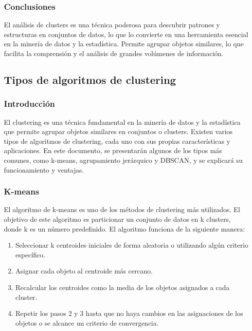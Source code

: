 \documentclass{article}
\begin{document}
\subsubsection*{Conclusiones}
El análisis de clusters es una técnica poderosa para descubrir patrones y estructuras en conjuntos de datos, lo que lo convierte en una herramienta esencial en la minería de datos y la estadística. Permite agrupar objetos similares, lo que facilita la comprensión y el análisis de grandes volúmenes de información.
\subsection{Tipos de algoritmos de clustering}
\subsubsection{Introducción}
El clustering es una técnica fundamental en la minería de datos y la estadística que permite agrupar objetos similares en conjuntos o clusters. Existen varios tipos de algoritmos de clustering, cada uno con sus propias características y aplicaciones. En este documento, se presentarán algunos de los tipos más comunes, como k-means, agrupamiento jerárquico y DBSCAN, y se explicará su funcionamiento y ventajas.
\subsubsection{K-means}
El algoritmo de k-means es uno de los métodos de clustering más utilizados. El objetivo de este algoritmo es particionar un conjunto de datos en k clusters, donde k es un número predefinido. El algoritmo funciona de la siguiente manera:

\begin{enumerate}
  \item Seleccionar k centroides iniciales de forma aleatoria o utilizando algún criterio específico.
  \item Asignar cada objeto al centroide más cercano.
  \item Recalcular los centroides como la media de los objetos asignados a cada cluster.
  \item Repetir los pasos 2 y 3 hasta que no haya cambios en las asignaciones de los objetos o se alcance un criterio de convergencia.
\end{enumerate}
\end{document}
